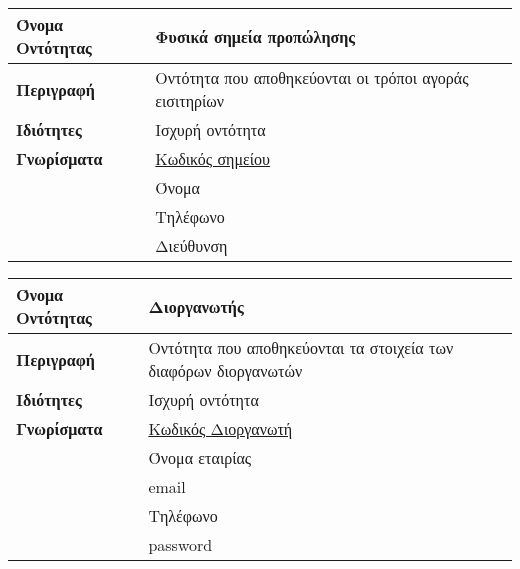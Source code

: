 \begin{center}
\begin{tabular}[]{|p{4cm}|p{10cm}|}
 \hline
\textbf{Όνομα Οντότητας}   &  Φυσικά σημεία προπώλησης \\ \hline 
\textbf{Περιγραφή}         &  Οντότητα που αποθηκεύονται οι τρόποι αγοράς εισιτηρίων \\\hline 
\textbf{Ιδιότητες}         &  Ισχυρή οντότητα \\       \hline           
\textbf{Γνωρίσματα}        &  \underline{Κωδικός σημείου} \\
                           &  Όνομα \\
                           &  Τηλέφωνο \\
                           &  Διεύθυνση \\ 
\hline 
\end{tabular}
\vspace{0.3 cm}

\begin{tabular}[]{|p{4cm}|p{10cm}|}
\hline
\textbf{Όνομα Οντότητας}   &  Διοργανωτής \\ \hline 
\textbf{Περιγραφή}         &  Οντότητα που αποθηκεύονται τα στοιχεία
                             των διαφόρων διοργανωτών \\ \hline 
\textbf{Ιδιότητες}         &  Ισχυρή οντότητα \\  \hline                 
\textbf{Γνωρίσματα}        &  \underline{Κωδικός Διοργανωτή} \\
            ~              &  Όνομα εταιρίας \\
             ~             &  email \\
                           &  Τηλέφωνο \\
                           &  password \\
\hline
\end{tabular}
\vspace{0.3 cm}


\end{center}
